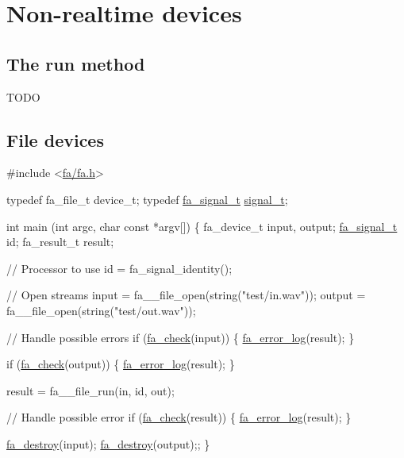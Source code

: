 \hypertarget{md__devices_id8127832}{}\section{Non-\/realtime devices}\label{md__devices_id8127832}
\hypertarget{md__devices_id98281723}{}\subsection{The run method}\label{md__devices_id98281723}
T\-O\-D\-O\hypertarget{md__devices_id9192746}{}\subsection{File devices}\label{md__devices_id9192746}

\begin{DoxyCode}
\textcolor{preprocessor}{#include <\hyperlink{fa_2fa_8h}{fa/fa.h}>}

\textcolor{keyword}{typedef} fa\_file\_t      device\_t;
\textcolor{keyword}{typedef} \hyperlink{group___fa_signal_gac5c72f160cd6e93a6783551627b166e5}{fa\_signal\_t}    \hyperlink{util_8h_a4179e0566b0727e21f1fd4b5e6533dee}{signal\_t};

\textcolor{keywordtype}{int} main (\textcolor{keywordtype}{int} argc, \textcolor{keywordtype}{char} \textcolor{keyword}{const} *argv[])
\{
    fa\_device\_t    input, output;
    \hyperlink{group___fa_signal_gac5c72f160cd6e93a6783551627b166e5}{fa\_signal\_t}    id;
    fa\_result\_t    result;

    \textcolor{comment}{// Processor to use}
    \textcolor{keywordtype}{id} = fa\_signal\_identity();

    \textcolor{comment}{// Open streams}
    input   = fa\_\_file\_open(\textcolor{keywordtype}{string}(\textcolor{stringliteral}{"test/in.wav"}));
    output  = fa\_\_file\_open(\textcolor{keywordtype}{string}(\textcolor{stringliteral}{"test/out.wav"}));

    \textcolor{comment}{// Handle possible errors}
    \textcolor{keywordflow}{if} (\hyperlink{group___fa_gaec61e23c174faf5e5244ae876d264eb5}{fa\_check}(input)) \{
        \hyperlink{group___fa_error_ga466e0539bedb29f68527448ed9ba11bf}{fa\_error\_log}(result);
    \}                                    

    \textcolor{keywordflow}{if} (\hyperlink{group___fa_gaec61e23c174faf5e5244ae876d264eb5}{fa\_check}(output)) \{
        \hyperlink{group___fa_error_ga466e0539bedb29f68527448ed9ba11bf}{fa\_error\_log}(result);
    \}                                    

    result  = fa\_\_file\_run(in, \textcolor{keywordtype}{id}, out);

    \textcolor{comment}{// Handle possible error}
    \textcolor{keywordflow}{if} (\hyperlink{group___fa_gaec61e23c174faf5e5244ae876d264eb5}{fa\_check}(result)) \{
        \hyperlink{group___fa_error_ga466e0539bedb29f68527448ed9ba11bf}{fa\_error\_log}(result);
    \}                                    

    \hyperlink{group___fa_ga6fd6818b190b9e41a3b5f07e78638539}{fa\_destroy}(input);
    \hyperlink{group___fa_ga6fd6818b190b9e41a3b5f07e78638539}{fa\_destroy}(output);;
\}
\end{DoxyCode}
